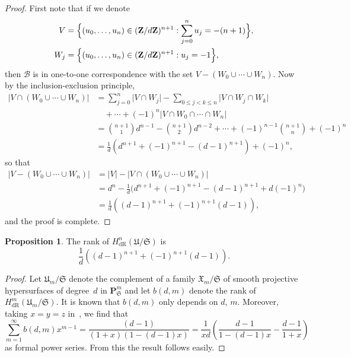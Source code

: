 \documentclass[a4paper,11pt]{article}
\numberwithin{equation}{section}
\providecommand{\abs}[1]{\lvert#1\rvert}                 %
\newcommand{\ZZ}{\mathbf{Z}} %
\providecommand{\HdR}{H_{\text{dR}}}    %
\providecommand{\cB}{\mathcal{B}} %
\theoremstyle{definition}
\newtheorem{prop}[thm]{Proposition}
\begin{document}
\begin{proof}
First note that if we denote
\begin{align*}
V   &= \Bigl\{(u_0,\dotsc,u_n) \in (\ZZ/d\ZZ)^{n+1} : \sum_{j=0}^n u_j = -(n+1) \Bigr\}, \\
W_j &= \Bigl\{(u_0,\dotsc,u_n) \in (\ZZ/d\ZZ)^{n+1} : u_j = -1 \Bigr\},
\end{align*}
then  $\cB$ is in one-to-one correspondence with the set $V-(W_0 \cup \dotsb \cup W_n)$. 
Now by the inclusion-exclusion principle, 
\begin{align*}
\abs{V \cap (W_0 \cup \dotsb \cup W_n)} 
& = \sum_{j=0}^n \abs{V \cap W_j} 
    - \sum_{0 \leq j < k \leq n} \abs{V \cap W_j \cap W_k} \\
& \quad + \dotsb + (-1)^{n} \abs{V \cap W_0 \cap \dotsb \cap W_n} \\
& = {n+1 \choose 1} d^{n-1} -{n+1 \choose 2} d^{n-2} 
    + \dotsb + (-1)^{n-1} {n+1 \choose n} + (-1)^{n} \\
& = \frac{1}{d} \left(d^{n+1}+(-1)^{n+1} - (d-1)^{n+1}\right)+(-1)^n,
\end{align*}
so that
\begin{align*}
\abs{V-(W_0 \cup \dotsb \cup W_n)}&=\abs{V}-\abs{V \cap (W_0 \cup \dotsb \cup W_n)} \\
&= d^n - \frac{1}{d} \bigl(d^{n+1}+(-1)^{n+1} - (d-1)^{n+1}+d (-1)^n \bigr) \\
&= \frac{1}{d} \left((d-1)^{n+1} + (-1)^{n+1}(d-1) \right),
\end{align*}
and the proof is complete.
\end{proof}

\begin{prop} \label{prop:rankcoho}
The rank of $\HdR^n(\mathfrak{U}/\mathfrak{S})$ is
\[
\frac{1}{d} \left((d-1)^{n+1} + (-1)^{n+1}(d-1) \right).
\]
\end{prop}

\begin{proof}
Let $\mathfrak{U}_m/\mathfrak{S}$ denote the complement of a family
$\mathfrak{X}_m/\mathfrak{S}$ of smooth projective hypersurfaces of 
degree~$d$ in $\mathbf{P}^m_{\mathfrak{S}}$ and let $b(d,m)$ denote 
the rank of $\HdR^m(\mathfrak{U}_m/\mathfrak{S})$. It is known that 
$b(d,m)$ only depends on $d$, $m$. Moreover, taking $x=y=z$ 
in~\citep[Corollaire~2.4~(i)]{sga7}, we find that
\[
\sum_{m=1}^{\infty} b(d,m) x^{m-1} 
  = \frac{(d-1)}{(1+x)(1-(d-1)x)} 
  = \frac{1}{xd} \left( \frac{d-1}{1-(d-1)x} - \frac{d-1}{1+x} \right)
\]
as formal power series. From this the result follows easily. 
\end{proof}
\end{document}

